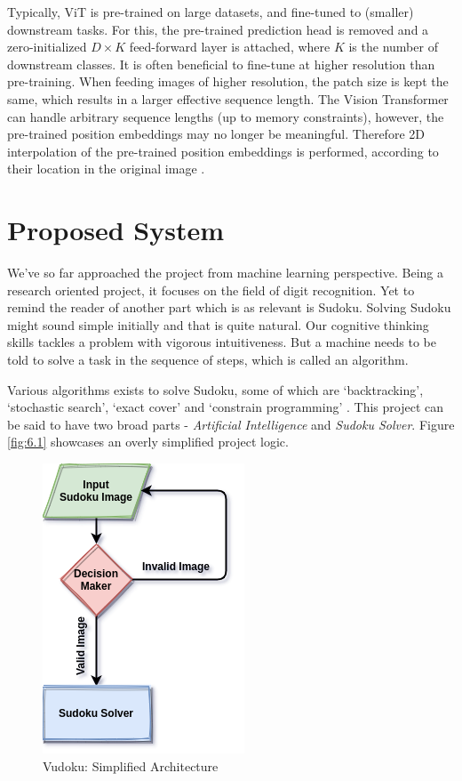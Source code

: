\documentclass[12pt, a4paper]{report}
\begin{document}
\hspace{0.5cm} Typically, ViT is pre-trained on large datasets, and fine-tuned to (smaller) downstream tasks. For this, the pre-trained prediction head is removed and a zero-initialized $D\times K$ feed-forward layer is attached, where $K$ is the number of downstream classes. It is often beneficial to fine-tune at higher resolution than pre-training. When feeding images of higher resolution, the patch size is kept the same, which results in a larger effective sequence length. The Vision Transformer can handle arbitrary sequence lengths (up to memory constraints), however, the pre-trained position embeddings may no longer be meaningful. Therefore 2D interpolation of the pre-trained position embeddings is performed, according to their location in the original image \cite{2020arXiv201011929D}.
\vspace*{\fill}

\chapter{Proposed System}
\label{chap:proposed}
\thispagestyle{fancy}

\hspace{0.5cm} We've so far approached the project from machine learning perspective. Being a research oriented project, it focuses on the field of digit recognition. Yet to remind the reader of another part which is as relevant is Sudoku. Solving Sudoku might sound simple initially and that is quite natural. Our cognitive thinking skills tackles a problem with vigorous intuitiveness. But a machine needs to be told to solve a task in the sequence of steps, which is called an algorithm.

Various algorithms exists to solve Sudoku, some of which are `backtracking', `stochastic search', `exact cover' and `constrain programming' \cite{wiki:solvsdkalgo}. This project can be said to have two broad parts - \emph{Artificial Intelligence} and \emph{Sudoku Solver}. Figure \eqref{fig:6.1} showcases an overly simplified project logic.

\begin{figure}[!htbp]
    \centering
    \includegraphics[height=0.5\textwidth]{vudoku_arch01.png}
    \caption[Vudoku: Simplified Architecture]{Vudoku: Simplified Architecture}
    \label{fig:6.1}
\end{figure}
\end{document}
